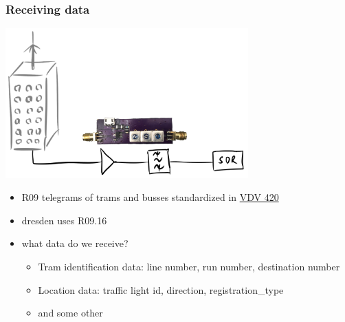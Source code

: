 \documentclass[aspectratio=169]{beamer}
\begin{document}

\begin{frame}
\frametitle{Receiving data}
\centering
\includegraphics[width=0.7\textwidth]{figs/antenna-filter.pdf}
\end{frame}


\begin{frame}
	\begin{itemize}
		\item R09 telegrams of trams and busses standardized in \href{https://knowhow.vdv.de/documents/420/}{VDV 420}
		\item dresden uses R09.16
		\item what data do we receive?
		\begin{itemize}
			\item Tram identification data: line number, run number, destination number
			\item Location data: traffic light id, direction, registration\_type
			\item and some other
		\end{itemize}
	\end{itemize}
\end{frame}

\end{document}
